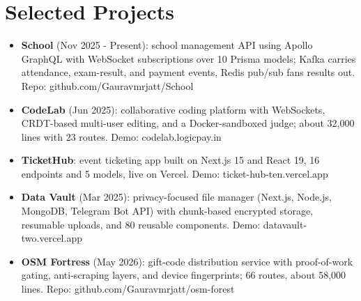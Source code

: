 \documentclass[11pt,a4paper,sans]{moderncv}
\begin{document}


\section{Selected Projects}
\vspace{1pt}
\begin{itemize}
    \item {\textbf{School} (Nov 2025 - Present): school management API using Apollo GraphQL with WebSocket subscriptions over 10 Prisma models; Kafka carries attendance, exam-result, and payment events, Redis pub/sub fans results out. Repo: github.com/Gauravmrjatt/School}
    \item {\textbf{CodeLab} (Jun 2025): collaborative coding platform with WebSockets, CRDT-based multi-user editing, and a Docker-sandboxed judge; about 32,000 lines with 23 routes. Demo: codelab.logicpay.in}
    \item {\textbf{TicketHub}: event ticketing app built on Next.js 15 and React 19, 16 endpoints and 5 models, live on Vercel. Demo: ticket-hub-ten.vercel.app}
    \item {\textbf{Data Vault} (Mar 2025): privacy-focused file manager (Next.js, Node.js, MongoDB, Telegram Bot API) with chunk-based encrypted storage, resumable uploads, and 80 reusable components. Demo: datavault-two.vercel.app}
    \item {\textbf{OSM Fortress} (May 2026): gift-code distribution service with proof-of-work gating, anti-scraping layers, and device fingerprints; 66 routes, about 58,000 lines. Repo: github.com/Gauravmrjatt/osm-forest}
\end{itemize}
\end{document}
